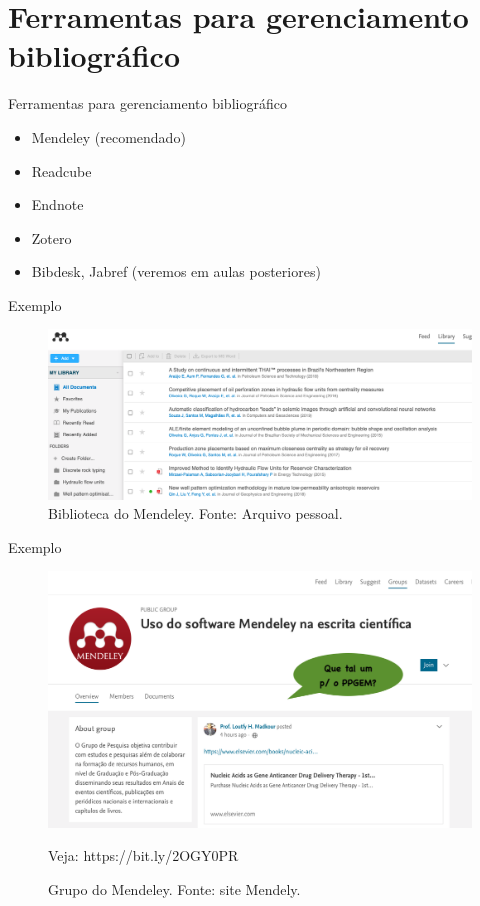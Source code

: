 \section{Ferramentas para gerenciamento bibliográfico}

\begin{frame}{Ferramentas para gerenciamento bibliográfico}
\begin{itemize}
\item Mendeley (recomendado)
\item Readcube
\item Endnote
\item Zotero
\item Bibdesk, Jabref (veremos em aulas posteriores)
\end{itemize}
\end{frame}

\begin{frame}{Exemplo}
\begin{figure}
\centering
\includegraphics[scale=0.25]{figs/02/mendeley}
\caption{Biblioteca do Mendeley. Fonte: Arquivo pessoal.}
\end{figure}
\end{frame}

\begin{frame}{Exemplo}
\begin{figure}
\centering
\includegraphics[scale=0.25]{figs/02/mendeley-ppgem}
\caption{Grupo do Mendeley. Fonte: site Mendely.}

\scriptsize{Veja: https://bit.ly/2OGY0PR}
\end{figure}
\end{frame}


